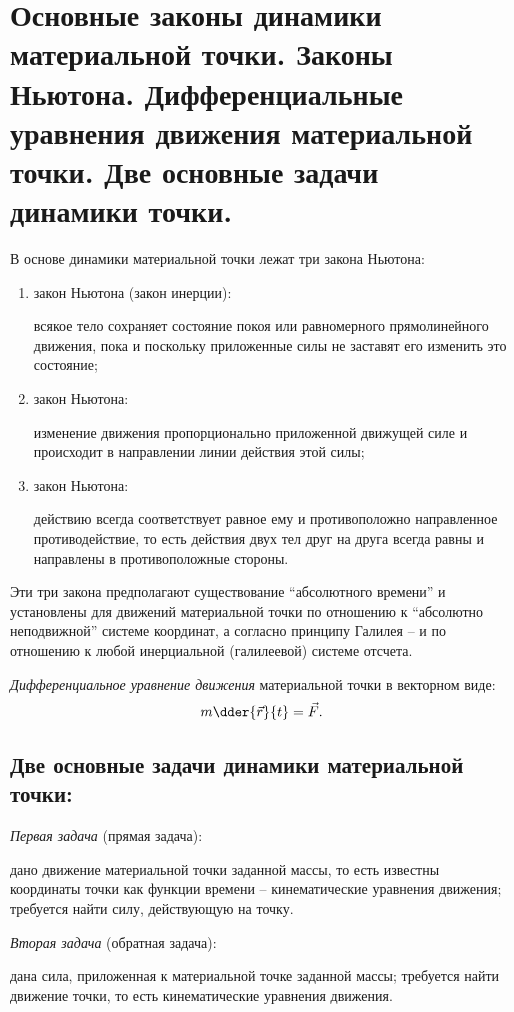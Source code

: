 \renewcommand{\labelenumi}{\Roman{enumi}}

\chapter{Основные законы динамики материальной точки. Законы Ньютона.
Дифференциальные уравнения движения материальной точки. Две основные задачи
динамики точки.}

В основе динамики материальной точки лежат три закона Ньютона:
\begin{enumerate}
    \item закон Ньютона (закон инерции):

    всякое тело сохраняет состояние покоя или равномерного прямолинейного
    движения, пока и поскольку приложенные силы не заставят его изменить это
    состояние;
    
    \item закон Ньютона:

    изменение движения пропорционально приложенной движущей силе и происходит
    в направлении линии действия этой силы;

    \item закон Ньютона:
    
    действию всегда соответствует равное ему и противоположно направленное
    противодействие, то есть действия двух тел друг на друга всегда равны и
    направлены в противоположные стороны.

\end{enumerate}
\renewcommand{\labelenumi}{\arabic{enumi}.}

Эти три закона предполагают существование ``абсолютного времени'' и установлены
для движений материальной точки по отношению к ``абсолютно неподвижной'' системе
координат, а согласно принципу Галилея -- и по отношению к любой инерциальной
(галилеевой) системе отсчета.

\emph{Дифференциальное уравнение движения} материальной точки в векторном виде:
\[
    m\dder{\vec{r}}{t} = \vec{F}.
\]

\section{Две основные задачи динамики материальной точки:}
\emph{Первая задача} (прямая задача):
    
дано движение материальной точки заданной массы, то есть известны координаты
точки как функции времени -- кинематические уравнения движения; требуется найти
силу, действующую на точку.

\emph{Вторая задача} (обратная задача):
    
дана сила, приложенная к материальной точке заданной массы; требуется найти
движение точки, то есть кинематические уравнения движения.

\newpage
